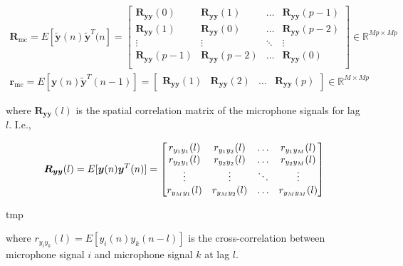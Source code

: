 \begin{eqnarray}
	\boldsymbol{R}_{\mathrm{mc}} = E[\boldsymbol{\tilde{y}}(n) \boldsymbol{\tilde{y}}^T(n] = 
	\begin{bmatrix}
		\boldsymbol{R}_{\boldsymbol{yy}}(0)     & \boldsymbol{R}_{\boldsymbol{yy}}(1)    & \dots   & \boldsymbol{R}_{\boldsymbol{yy}}(p-1)  \\
		\boldsymbol{R}_{\boldsymbol{yy}}(1)      & \boldsymbol{R}_{\boldsymbol{yy}}(0)      & \dots   & \boldsymbol{R}_{\boldsymbol{yy}}(p-2) \\
		\vdots                               & \vdots                               & \ddots & \vdots \\
		\boldsymbol{R}_{\boldsymbol{yy}}(p-1) & \boldsymbol{R}_{\boldsymbol{yy}}(p-2)  & \dots   & \boldsymbol{R}_{\boldsymbol{yy}}(0) \\
	\end{bmatrix}  \in  \mathbb{R} ^ {Mp \times Mp} \\
	\boldsymbol{r}_{\mathrm{mc}} = E[\boldsymbol{y}(n)\boldsymbol{\tilde{y}}^T(n-1)] = 
	\begin{bmatrix}
		\boldsymbol{R}_{\boldsymbol{yy}}(1)     & \boldsymbol{R}_{\boldsymbol{yy}}(2)     & \dots   & \boldsymbol{R}_{\boldsymbol{yy}}(p) 
	\end{bmatrix} \in  \mathbb{R} ^ {M \times Mp}
\end{eqnarray}

\noindent
where $\boldsymbol{R}_{\boldsymbol{yy}}(l)$ is the spatial correlation matrix of the microphone signals for lag $l$. I.e., 


\begin{equation}
	\boldsymbol{R}_{\boldsymbol{yy}}(l) = E[\boldsymbol{y}(n) \boldsymbol{y}^T(n)] = 
	\begin{bmatrix} 
		r_{y_1y_1}(l)   & r_{y_1y_2}(l)  & \dots   & r_{y_1y_M}(l) \\
		r_{y_2y_1}(l)   & r_{y_2y_2}(l)& \dots    & r_{y_2y_M}(l)  \\
		\vdots     & \vdots      & \ddots  & \vdots  \\
		r_{y_My_1}(l)  & r_{y_My_2}(l) & \dots    & r_{y_My_M}(l) \\
	\end{bmatrix} \\
\end{equation}

tmp

\noindent
where $r_{y_i y_k}(l)=E[y_i(n) y_k(n-l)]$ is the cross-correlation between microphone signal $i$ and microphone signal $k$ at lag $l$. 

